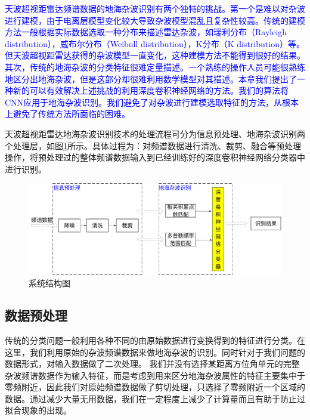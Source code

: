 \textcolor{blue}{天波超视距雷达频谱数据的地海杂波识别有两个独特的挑战。第一个是难以对杂波进行建模，由于电离层模型变化较大导致杂波模型混乱且复杂性较高。传统的建模方法一般根据实际数据选取一种分布来描述雷达杂波，如瑞利分布（Rayleigh distribution），威布尔分布（Weibull distribution），K分布（K distribution）等。但天波超视距雷达获得的杂波模型一直变化，这种建模方法不能得到很好的结果。其次，传统的地海杂波的分类特征很难定量描述。一个熟练的操作人员可能很熟练地区分出地海杂波，但是这部分却很难利用数学模型对其描述。本章我们提出了一种新的可以有效解决上述挑战的利用深度卷积神经网络的方法。我们的算法将CNN应用于地海杂波识别。我们避免了对杂波进行建模选取特征的方法，从根本上避免了传统方法所面临的困难。}

天波超视距雷达地海杂波识别技术的处理流程可分为信息预处理、地海杂波识别两个处理层，如图\ref{fig:system}所示。具体过程为：对频谱数据进行清洗、裁剪、融合等预处理操作，将预处理过的整体频谱数据输入到已经训练好的深度卷积神经网络分类器中进行识别。\begin{figure}[H]
	\centering
	\includegraphics[width=\textwidth]{figures/othr/system}
	\caption{系统结构图}
	\label{fig:system}
\end{figure}

\subsection{数据预处理}
传统的分类问题一般利用各种不同的由原始数据进行变换得到的特征进行分类。在这里，我们利用原始的杂波频谱数据来做地海杂波的识别。同时针对于我们问题的数据形式，对输入数据做了二次处理。
我们并没有选择某距离方位角单元的完整杂波频谱数据作为输入特征，而是考虑到用来区分地海杂波属性的特征主要集中于零频附近，因此我们对原始频谱数据做了剪切处理，只选择了零频附近一个区域的数据。通过减少大量无用数据，我们在一定程度上减少了计算量而且有助于防止过拟合现象的出现。

